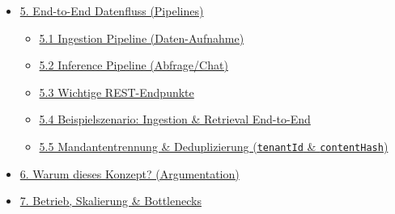 \begin{itemize}
  \begin{itemize}
  \tightlist
  \item
    \hyperref[41-topic-uxfcbersicht]{4.1 Topic-Übersicht}
  \item
    \hyperref[42-topic-payloads-schnittstellen-kontrakt]{4.2
    Topic-Payloads (Schnittstellen-Kontrakt)}
  \item
    \hyperref[43-beispiel-events-je-topic]{4.3 Beispiel-Events je Topic}
  \item
    \hyperref[44-producer-topic-consumer-mapping]{4.4
    Producer--Topic--Consumer Mapping}
  \item
    \hyperref[45-architekten-notiz-json-vs-avro-bewusst-json]{4.5
    Architekten-Notiz: JSON vs.~Avro (bewusst JSON)}
  \end{itemize}
\item
  \hyperref[5-end-to-end-datenfluss-pipelines]{5. End-to-End Datenfluss
  (Pipelines)}

  \begin{itemize}
  \tightlist
  \item
    \hyperref[51-ingestion-pipeline-daten-aufnahme]{5.1 Ingestion
    Pipeline (Daten-Aufnahme)}
  \item
    \hyperref[52-inference-pipeline-abfragechat]{5.2 Inference Pipeline
    (Abfrage/Chat)}
  \item
    \hyperref[53-wichtige-rest-endpunkte-schnittstellen-kontrakt]{5.3
    Wichtige REST-Endpunkte}
  \item
    \hyperref[54-beispielszenario-ingestion--retrieval-end-to-end]{5.4
    Beispielszenario: Ingestion \& Retrieval End-to-End}
  \item
    \hyperref[55-mandantentrennung--deduplizierung-tenantid--contenthash]{5.5
    Mandantentrennung \& Deduplizierung (\texttt{tenantId} \&
    \texttt{contentHash})}
  \end{itemize}
\item
  \hyperref[6-warum-dieses-konzept-argumentation]{6. Warum dieses
  Konzept? (Argumentation)}
\item
  \hyperref[7-betrieb-skalierung--bottlenecks]{7. Betrieb, Skalierung \&
  Bottlenecks}


\end{itemize}
